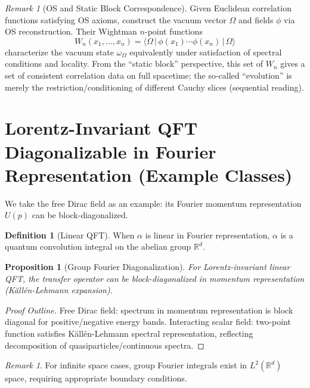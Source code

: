 \documentclass[11pt]{article}
\newtheorem{proposition}[theorem]{Proposition}
\theoremstyle{definition}
\newtheorem{definition}[theorem]{Definition}
\theoremstyle{remark}
\newtheorem{remark}[theorem]{Remark}
\begin{document}
\begin{remark}[OS and Static Block Correspondence]
Given Euclidean correlation functions satisfying OS axioms, construct the vacuum vector \( \Omega \) and fields \( \phi \) via OS reconstruction. Their Wightman \( n \)-point functions
\[
W_n(x_1,\ldots,x_n)=\langle\Omega\,|\,\phi(x_1)\cdots\phi(x_n)\,|\,\Omega\rangle
\]
characterize the vacuum state \( \omega_\Omega \) equivalently under satisfaction of spectral conditions and locality. From the ``static block'' perspective, this set of \( W_n \) gives a set of consistent correlation data on full spacetime; the so-called ``evolution'' is merely the restriction/conditioning of different Cauchy slices (sequential reading).
\end{remark}

\section{Lorentz-Invariant QFT Diagonalizable in Fourier Representation (Example Classes)}\label{sec:lorentz}

We take the free Dirac field as an example: its Fourier momentum representation \( U(p) \) can be block-diagonalized.

\begin{definition}[Linear QFT]\label{def:linear}
When \( \alpha \) is linear in Fourier representation, \( \alpha \) is a quantum convolution integral on the abelian group \( \mathbb{R}^d \).
\end{definition}

\begin{proposition}[Group Fourier Diagonalization]\label{prop:fourier}
For Lorentz-invariant linear QFT, the transfer operator can be block-diagonalized in momentum representation (Källén-Lehmann expansion).
\end{proposition}

\begin{proof}[Proof Outline]
Free Dirac field: spectrum in momentum representation is block diagonal for positive/negative energy bands. Interacting scalar field: two-point function satisfies Källén-Lehmann spectral representation, reflecting decomposition of quasiparticles/continuous spectra.
\end{proof}

\begin{remark}
For infinite space cases, group Fourier integrals exist in \( L^2(\mathbb{R}^d) \) space, requiring appropriate boundary conditions.
\end{remark}
\end{document}
